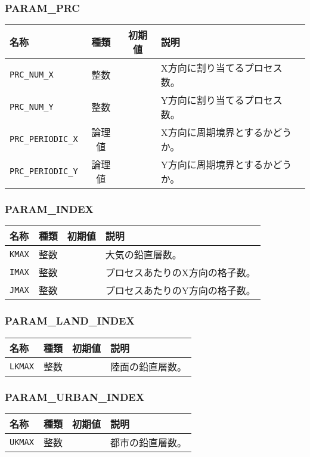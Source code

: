 \subsubsection{PARAM\_PRC}
\begin{tabularx}{150mm}{|l|c|c|X|} \hline
 \rowcolor[gray]{0.9} 名称 & 種類 & 初期値 & 説明 \\ \hline
 \verb|PRC_NUM_X| & 整数 &  & X方向に割り当てるプロセス数。 \\ \hline
 \verb|PRC_NUM_Y| & 整数 &  & Y方向に割り当てるプロセス数。 \\ \hline
 \verb|PRC_PERIODIC_X| & 論理値 &  & X方向に周期境界とするかどうか。 \\ \hline
 \verb|PRC_PERIODIC_Y| & 論理値 &  & Y方向に周期境界とするかどうか。 \\ \hline
\end{tabularx}


\subsubsection{PARAM\_INDEX}
\begin{tabularx}{150mm}{|l|c|c|X|} \hline
 \rowcolor[gray]{0.9} 名称 & 種類 & 初期値 & 説明 \\ \hline
 \verb|KMAX| & 整数 &  & 大気の鉛直層数。 \\ \hline
 \verb|IMAX| & 整数 &  & プロセスあたりのX方向の格子数。 \\ \hline
 \verb|JMAX| & 整数 &  & プロセスあたりのY方向の格子数。 \\ \hline
\end{tabularx}


\subsubsection{PARAM\_LAND\_INDEX}
\begin{tabularx}{150mm}{|l|c|c|X|} \hline
 \rowcolor[gray]{0.9} 名称 & 種類 & 初期値 & 説明 \\ \hline
 \verb|LKMAX| & 整数 &  & 陸面の鉛直層数。 \\ \hline
\end{tabularx}


\subsubsection{PARAM\_URBAN\_INDEX}
\begin{tabularx}{150mm}{|l|c|c|X|} \hline
 \rowcolor[gray]{0.9} 名称 & 種類 & 初期値 & 説明 \\ \hline
 \verb|UKMAX| & 整数 &  & 都市の鉛直層数。 \\ \hline
\end{tabularx}


